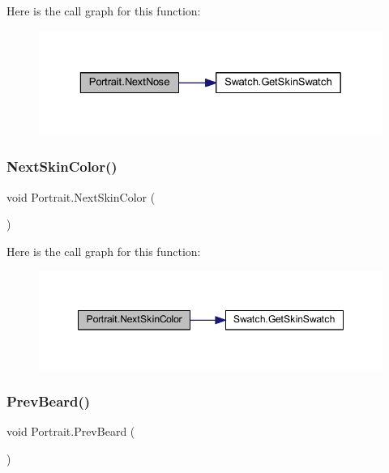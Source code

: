 Here is the call graph for this function\+:
\nopagebreak
\begin{figure}[H]
\begin{center}
\leavevmode
\includegraphics[width=329pt]{class_portrait_a7fc2c7d9f078303182503c717c05b9d5_cgraph}
\end{center}
\end{figure}
\mbox{\label{class_portrait_a601ece8887c692a5a9f6d910fd3a2cec}} 
\subsubsection{\texorpdfstring{NextSkinColor()}{NextSkinColor()}}
{\footnotesize\ttfamily void Portrait.\+Next\+Skin\+Color (\begin{DoxyParamCaption}{ }\end{DoxyParamCaption})}

Here is the call graph for this function\+:
\nopagebreak
\begin{figure}[H]
\begin{center}
\leavevmode
\includegraphics[width=348pt]{class_portrait_a601ece8887c692a5a9f6d910fd3a2cec_cgraph}
\end{center}
\end{figure}
\mbox{\label{class_portrait_ada91686eb3d44e5771a81dc147462258}} 
\subsubsection{\texorpdfstring{PrevBeard()}{PrevBeard()}}
{\footnotesize\ttfamily void Portrait.\+Prev\+Beard (\begin{DoxyParamCaption}{ }\end{DoxyParamCaption})}

